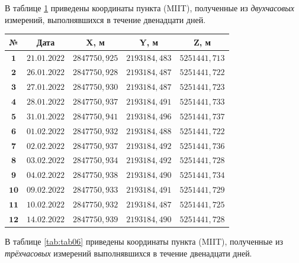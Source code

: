 В таблице \cref{tab:tab05} приведены координаты пункта (MIIT), полученные из \textit{двухчасовых} измерений, выполнявшихся в течение двенадцати дней.

\begin{table} [htbp]
	\centering\small
	\label{tab:tab05}{%
		\begin{tabular}{|c|c|c|c|c|}
			\hline
			\textbf{№} & \textbf{Дата} & \textbf{X, м} & \textbf{Y, м} & \textbf{Z, м} \\
			\hline
			\textbf{ $\mathbf{1}$} & $21.01.2022$ & $2847750,925$ & $2193184,483$ & $5251441,713$ \\
			\hline
			\textbf{ $\mathbf{2}$} & $26.01.2022$ & $2847750,928$ & $2193184,487$ & $5251441,722$ \\
			\hline
			\textbf{ $\mathbf{3}$} & $27.01.2022$ & $2847750,930$ & $2193184,487$ & $5251441,723$ \\
			\hline
			\textbf{ $\mathbf{4}$} & $28.01.2022$ & $2847750,937$ & $2193184,491$ & $5251441,733$ \\
			\hline
			\textbf{ $\mathbf{5}$} & $31.01.2022$ & $2847750,941$ & $2193184,496$ & $5251441,737$ \\
			\hline
			\textbf{ $\mathbf{6}$} & $01.02.2022$ & $2847750,932$ & $2193184,488$ & $5251441,722$ \\
			\hline
			\textbf{ $\mathbf{7}$} & $02.02.2022$ & $2847750,937$ & $2193184,492$ & $5251441,736$ \\
			\hline
			\textbf{ $\mathbf{8}$} & $03.02.2022$ & $2847750,934$ & $2193184,492$ & $5251441,728$ \\
			\hline
			\textbf{ $\mathbf{9}$} & $04.02.2022$ & $2847750,938$ & $2193184,490$ & $5251441,734$ \\
			\hline
			\textbf{$\mathbf{10}$} & $09.02.2022$ & $2847750,933$ & $2193184,491$ & $5251441,729$ \\
			\hline
			\textbf{$\mathbf{11}$} & $10.02.2022$ & $2847750,932$ & $2193184,487$ & $5251441,725$ \\
			\hline
			\textbf{$\mathbf{12}$} & $14.02.2022$ & $2847750,939$ & $2193184,490$ & $5251441,728$ \\
			\hline
		\end{tabular}
	}
\end{table}

В таблице \cref{tab:tab06} приведены координаты пункта (MIIT), полученные из \textit{трёхчасовых} измерений выполнявшихся в течение двенадцати дней.

